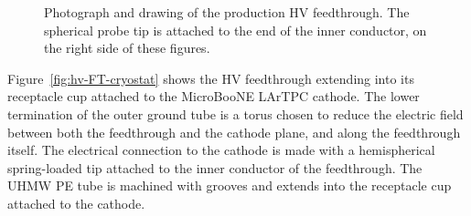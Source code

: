 \begin{figure}
\caption{Photograph and drawing of the production HV feedthrough. The spherical probe tip is attached to the end of the inner conductor, on the right side of these figures.}
\label{fig:hv_ftpic}
\end{figure}


Figure~\ref{fig:hv-FT-cryostat} shows the HV feedthrough extending into its receptacle cup attached to the MicroBooNE LArTPC cathode.  The lower termination of the outer ground tube is a torus chosen to reduce the electric field between both the feedthrough and the cathode plane, and along the feedthrough itself.  The electrical connection to the cathode is made with a hemispherical spring-loaded tip attached to the inner conductor of the feedthrough.  The UHMW PE tube is machined with grooves and extends into the receptacle cup attached to the cathode.

